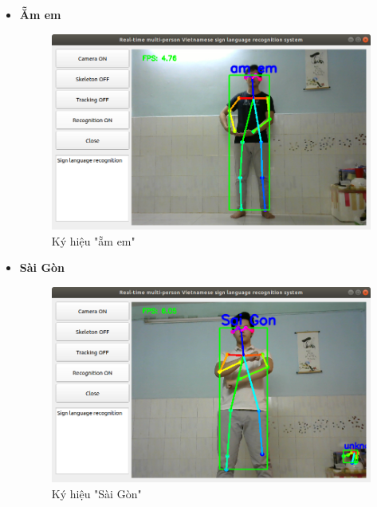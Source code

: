 \documentclass[12pt,a4paper,oneside]{book}
\numberwithin{equation}{chapter} %
\numberwithin{figure}{chapter} %
\numberwithin{table}{chapter} %
\begin{document}
\begin{itemize}
\item \textbf{Ẵm em}
\FloatBarrier
\begin{figure}[htp]
\begin{center}
\includegraphics[scale=0.4]{kq/am_em.png}
\end{center}
\caption{Ký hiệu "ẵm em"}
\end{figure}
\FloatBarrier

\item \textbf{Sài Gòn}
\FloatBarrier
\begin{figure}[htp]
\begin{center}
\includegraphics[scale=0.4]{kq/sai_gon.png}
\end{center}
\caption{Ký hiệu "Sài Gòn"}
\end{figure}
\FloatBarrier

\thispagestyle{phuluc}
\pagebreak


\end{itemize}
\end{document}

